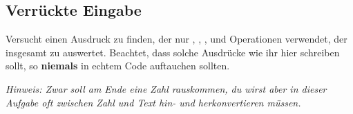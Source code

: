 \subsection{Verrückte Eingabe }

Versucht einen Ausdruck zu finden, der nur , ,
,  und Operationen verwendet, der
insgesamt zu  auswertet. Beachtet, dass solche Ausdrücke
wie ihr hier schreiben sollt, so \textbf{niemals} in echtem Code auftauchen
sollten.

\textit{Hinweis: Zwar soll am Ende eine Zahl rauskommen, du wirst aber in dieser Aufgabe oft zwischen Zahl und Text hin- und herkonvertieren müssen.}